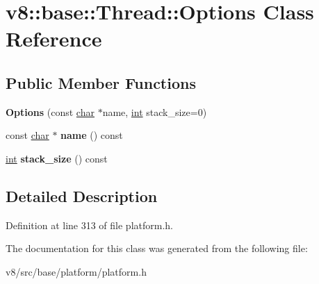 \hypertarget{classv8_1_1base_1_1Thread_1_1Options}{}\section{v8\+:\+:base\+:\+:Thread\+:\+:Options Class Reference}
\label{classv8_1_1base_1_1Thread_1_1Options}
\subsection*{Public Member Functions}
\begin{DoxyCompactItemize}
\item 
\mbox{\label{classv8_1_1base_1_1Thread_1_1Options_af649d5e596f4538bb03ca8ea95bbf969}} 
{\bfseries Options} (const \mbox{\hyperlink{classchar}{char}} $\ast$name, \mbox{\hyperlink{classint}{int}} stack\+\_\+size=0)
\item 
\mbox{\label{classv8_1_1base_1_1Thread_1_1Options_a98daf6b7865ff6fc2db910e5bb5c45e0}} 
const \mbox{\hyperlink{classchar}{char}} $\ast$ {\bfseries name} () const
\item 
\mbox{\label{classv8_1_1base_1_1Thread_1_1Options_a392de9ec1fd2f4d0baec62b02593138e}} 
\mbox{\hyperlink{classint}{int}} {\bfseries stack\+\_\+size} () const
\end{DoxyCompactItemize}


\subsection{Detailed Description}


Definition at line 313 of file platform.\+h.



The documentation for this class was generated from the following file\+:\begin{DoxyCompactItemize}
\item 
v8/src/base/platform/platform.\+h\end{DoxyCompactItemize}
